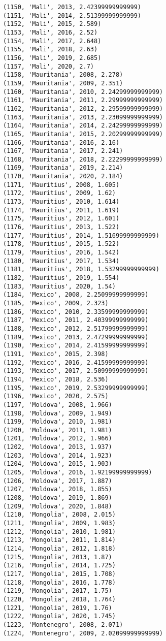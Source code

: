 \documentclass[11pt]{article}
\begin{document}
\begin{Verbatim}[commandchars=\\\{\}]
(1150, 'Mali', 2013, 2.42399999999999)
(1151, 'Mali', 2014, 2.51399999999999)
(1152, 'Mali', 2015, 2.589)
(1153, 'Mali', 2016, 2.52)
(1154, 'Mali', 2017, 2.648)
(1155, 'Mali', 2018, 2.63)
(1156, 'Mali', 2019, 2.685)
(1157, 'Mali', 2020, 2.7)
(1158, 'Mauritania', 2008, 2.278)
(1159, 'Mauritania', 2009, 2.351)
(1160, 'Mauritania', 2010, 2.24299999999999)
(1161, 'Mauritania', 2011, 2.29999999999999)
(1162, 'Mauritania', 2012, 2.29599999999999)
(1163, 'Mauritania', 2013, 2.23099999999999)
(1164, 'Mauritania', 2014, 2.24299999999999)
(1165, 'Mauritania', 2015, 2.20299999999999)
(1166, 'Mauritania', 2016, 2.16)
(1167, 'Mauritania', 2017, 2.241)
(1168, 'Mauritania', 2018, 2.22299999999999)
(1169, 'Mauritania', 2019, 2.214)
(1170, 'Mauritania', 2020, 2.184)
(1171, 'Mauritius', 2008, 1.605)
(1172, 'Mauritius', 2009, 1.62)
(1173, 'Mauritius', 2010, 1.614)
(1174, 'Mauritius', 2011, 1.619)
(1175, 'Mauritius', 2012, 1.601)
(1176, 'Mauritius', 2013, 1.522)
(1177, 'Mauritius', 2014, 1.51699999999999)
(1178, 'Mauritius', 2015, 1.522)
(1179, 'Mauritius', 2016, 1.542)
(1180, 'Mauritius', 2017, 1.534)
(1181, 'Mauritius', 2018, 1.53299999999999)
(1182, 'Mauritius', 2019, 1.554)
(1183, 'Mauritius', 2020, 1.54)
(1184, 'Mexico', 2008, 2.25099999999999)
(1185, 'Mexico', 2009, 2.323)
(1186, 'Mexico', 2010, 2.33599999999999)
(1187, 'Mexico', 2011, 2.40399999999999)
(1188, 'Mexico', 2012, 2.51799999999999)
(1189, 'Mexico', 2013, 2.47299999999999)
(1190, 'Mexico', 2014, 2.41599999999999)
(1191, 'Mexico', 2015, 2.398)
(1192, 'Mexico', 2016, 2.41599999999999)
(1193, 'Mexico', 2017, 2.50999999999999)
(1194, 'Mexico', 2018, 2.536)
(1195, 'Mexico', 2019, 2.53299999999999)
(1196, 'Mexico', 2020, 2.575)
(1197, 'Moldova', 2008, 1.966)
(1198, 'Moldova', 2009, 1.949)
(1199, 'Moldova', 2010, 1.981)
(1200, 'Moldova', 2011, 1.981)
(1201, 'Moldova', 2012, 1.966)
(1202, 'Moldova', 2013, 1.937)
(1203, 'Moldova', 2014, 1.923)
(1204, 'Moldova', 2015, 1.903)
(1205, 'Moldova', 2016, 1.92199999999999)
(1206, 'Moldova', 2017, 1.887)
(1207, 'Moldova', 2018, 1.855)
(1208, 'Moldova', 2019, 1.869)
(1209, 'Moldova', 2020, 1.848)
(1210, 'Mongolia', 2008, 2.015)
(1211, 'Mongolia', 2009, 1.983)
(1212, 'Mongolia', 2010, 1.981)
(1213, 'Mongolia', 2011, 1.814)
(1214, 'Mongolia', 2012, 1.818)
(1215, 'Mongolia', 2013, 1.87)
(1216, 'Mongolia', 2014, 1.725)
(1217, 'Mongolia', 2015, 1.708)
(1218, 'Mongolia', 2016, 1.778)
(1219, 'Mongolia', 2017, 1.75)
(1220, 'Mongolia', 2018, 1.764)
(1221, 'Mongolia', 2019, 1.76)
(1222, 'Mongolia', 2020, 1.745)
(1223, 'Montenegro', 2008, 2.071)
(1224, 'Montenegro', 2009, 2.02099999999999)

\end{Verbatim}
\end{document}

